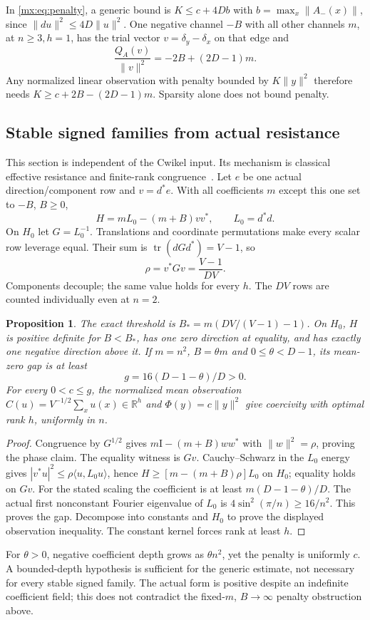 \documentclass[11pt]{article}
\newcommand{\R}{\mathbb R}
\newtheorem{matrixProposition}[theorem]{Proposition}
\providecommand{\tr}{\operatorname{tr}}
\providecommand{\id}{\mathrm I}
\begin{document}
In \eqref{mx:eq:penalty}, a generic bound is $K\leq c+4Db$ with
$b=\max_x\|A_-(x)\|$, since $\|du\|^2\leq4D\|u\|^2$.
One negative channel $-B$ with all other channels $m$, at $n\geq3,h=1$,
has the trial vector $v=\delta_y-\delta_x$ on that edge and
\[
 \frac{Q_A(v)}{\|v\|^2}=-2B+(2D-1)m.
\]
Any normalized linear observation with penalty bounded by $K\|y\|^2$
therefore needs $K\geq c+2B-(2D-1)m$. Sparsity alone does not bound penalty.

\subsection{Stable signed families from actual resistance}
This section is independent of the Cwikel input. Its mechanism is classical
effective resistance and finite-rank congruence~\cite{mx:Zelazo,mx:Spielman}.
Let $e$ be one actual direction/component row and $v=d^*e$. With all
coefficients $m$ except this one set to $-B$, $B\geq0$,
\[
 H=mL_0-(m+B)vv^*,\qquad L_0=d^*d.
\]
On $H_0$ let $G=L_0^{-1}$. Translations and coordinate permutations make
every scalar row leverage equal. Their sum is
$\tr(dGd^*)=V-1$, so
\begin{equation}\label{mx:eq:rho}
 \rho=v^*Gv=\frac{V-1}{DV}.
\end{equation}
Components decouple; the same value holds for every $h$. The $DV$ rows
are counted individually even at $n=2$.

\begin{matrixProposition}\label{mx:prop:phase}
The exact threshold is $B_*=m(DV/(V-1)-1)$. On $H_0$, $H$ is positive
definite for $B<B_*$, has one zero direction at equality, and has exactly
one negative direction above it. If $m=n^2$, $B=\theta m$ and
$0\leq\theta<D-1$, its mean-zero gap is at least
\[
 g=16(D-1-\theta)/D>0.
\]
For every $0<c\leq g$, the normalized mean observation
$C(u)=V^{-1/2}\sum_xu(x)\in\R^h$ and $\Phi(y)=c\|y\|^2$ give coercivity
with optimal rank $h$, uniformly in $n$.
\end{matrixProposition}
\begin{proof}
Congruence by $G^{1/2}$ gives $m\id-(m+B)ww^*$ with $\|w\|^2=\rho$,
proving the phase claim. The equality witness is $Gv$.
Cauchy--Schwarz in the $L_0$ energy gives
$|v^*u|^2\leq\rho\langle u,L_0u\rangle$, hence
$H\geq[m-(m+B)\rho]L_0$ on $H_0$; equality holds on $Gv$.
For the stated scaling the coefficient is at least
$m(D-1-\theta)/D$. The actual first nonconstant Fourier eigenvalue of $L_0$
is $4\sin^2(\pi/n)\geq16/n^2$. This proves the gap. Decompose into
constants and $H_0$ to prove the displayed observation inequality.
The constant kernel forces rank at least $h$.
\end{proof}
For $\theta>0$, negative coefficient depth grows as $\theta n^2$, yet the
penalty is uniformly $c$. A bounded-depth hypothesis is sufficient for the
generic estimate, not necessary for every stable signed family. The actual
form is positive despite an indefinite coefficient field; this does not
contradict the fixed-$m$, $B\to\infty$ penalty obstruction above.
\end{document}
